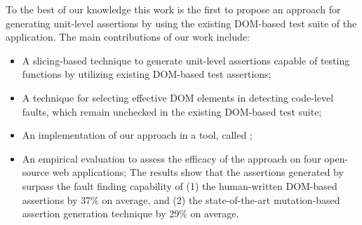 To the best of our knowledge this work is the first to propose an approach for generating unit-level assertions by using the existing DOM-based test suite of the application. The main contributions of our work include:
\begin{itemize}[noitemsep]
\item A slicing-based technique to generate unit-level assertions capable of testing \javascript functions by utilizing existing DOM-based test assertions;
\item A technique for selecting effective DOM elements in detecting code-level faults, which remain unchecked in the existing DOM-based test suite;
\item An implementation of our approach in a tool, called \tool; 
\item An empirical evaluation to assess the efficacy of the approach on four open-source web applications;
The results show that the assertions generated by \tool surpass the fault finding capability of (1) the human-written DOM-based assertions by 37\% on average, and (2) the state-of-the-art mutation-based assertion generation technique by 29\% on average.
\end{itemize} 